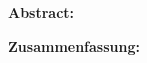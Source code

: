 \thispagestyle{empty}
\begin{center}
  \begin{minipage}[c][0.48\textheight][b]{\textwidth}
    \small
    \textbf{Abstract:}\par
    \vspace{\baselineskip}
    
  \end{minipage}\par
  \vfill
  \begin{minipage}[c][0.48\textheight][b]{\textwidth}
    \small
    \textbf{Zusammenfassung:}\par
    \vspace{\baselineskip}
    
  \end{minipage}
\end{center}
